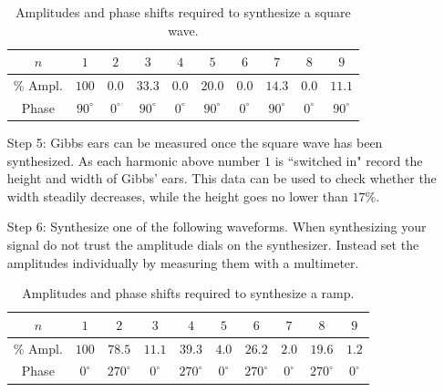\begin{itemize}[leftmargin = 50pt]
        \begin{table}[H]
            \centering 
            \caption{Amplitudes and phase shifts required to synthesize a square wave.}
            \begin{tabular}{|c|c|c|c|c|c|c|c|c|c|}
                \hline
                $n$ & $1$ & $2$ & $3$ & $4$ & $5$ & $6$ & $7$ & $8$ & $9$ \\ \hline
                \% Ampl. & $100$ & $0.0 $& $33.3$ & $0.0$ & $20.0$ & $0.0$ & $14.3$ & $0.0$ & $11.1$ \\ 
                Phase & $90^{\circ}$ & $0^{\circ}$ & $90^{\circ}$ & $0^{\circ}$ & $90^{\circ}$ & $0^{\circ}$ & $90^{\circ}$ & $0^{\circ}$ & $90^{\circ}$ \\ \hline
            \end{tabular}
            \label{tab:FS1}
        \end{table}
    \item[Step 5:] Gibbs ears can be measured once the square wave has been synthesized. As each harmonic above number $1$ is ``switched in" record the height and width of Gibbs' ears. This data can be used to check whether the width steadily decreases, while the height goes no lower than $17\%$.
    \item[Step 6:] Synthesize one of the following waveforms. When synthesizing your signal do not trust the amplitude dials on the synthesizer. Instead set the amplitudes individually by measuring them with a multimeter.
        \begin{table}[H]
            \centering 
            \caption{Amplitudes and phase shifts required to synthesize a ramp.}
            \begin{tabular}{|c|c|c|c|c|c|c|c|c|c|}
                \hline
                $n$ & $1$ & $2$ & $3$ & $4$ & $5$ & $6$ & $7$ & $8$ & $9$ \\ \hline
                \% Ampl. & $100$ & $78.5 $& $11.1$ & $39.3$ & $4.0$ & $26.2$ & $2.0$ & $19.6$ & $1.2$ \\ 
                Phase & $0^{\circ}$ & $270^{\circ}$ & $0^{\circ}$ & $270^{\circ}$ & $0^{\circ}$ & $270^{\circ}$ & $0^{\circ}$ & $270^{\circ}$ & $0^{\circ}$ \\ \hline
            \end{tabular}
            \label{tab:FS2}
        \end{table}


\end{itemize}
